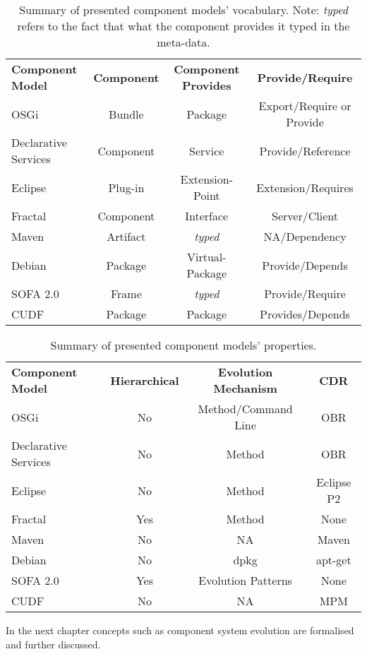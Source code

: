 \begin{table}
\begin{tabular}{|l | c | c | c | }
\textbf{Component Model}& \textbf{Component}& \textbf{Component Provides}	& \textbf{Provide/Require}\\

OSGi					& Bundle			& Package 					& Export/Require or Provide\\
Declarative Services	& Component			& Service 					& Provide/Reference\\
Eclipse					& Plug-in			& Extension-Point			& Extension/Requires\\
Fractal					& Component			& Interface 				& Server/Client\\
Maven					& Artifact			& \textit{typed} 			& NA/Dependency\\
Debian					& Package			& Virtual-Package 			& Provide/Depends\\
SOFA 2.0				& Frame				& \textit{typed} 			& Provide/Require\\
CUDF					& Package			& Package 					& Provides/Depends\\
\end{tabular}
\caption{Summary of presented component models' vocabulary. Note: \textit{typed} refers to the fact that what the component provides it typed in the meta-data.}
\label{background.comparisonvocab}
\end{table}

\begin{table}
\begin{tabular}{l | c | c | c  }
\textbf{Component Model}& \textbf{Hierarchical}& \textbf{Evolution Mechanism}	& \textbf{CDR}\\

OSGi					& No			& Method/Command Line 					& OBR\\
Declarative Services	& No			& Method 								& OBR\\
Eclipse					& No			& Method								& Eclipse P2\\
Fractal					& Yes			& Method 								& None\\
Maven					& No			& NA 									& Maven\\
Debian					& No			& dpkg 									& apt-get\\
SOFA 2.0				& Yes			& Evolution Patterns 					& None\\
CUDF					& No			& NA 									& MPM\\
\end{tabular}
\caption{Summary of presented component models' properties.}
\label{background.comparisonprop}
\end{table}


In the next chapter concepts such as component system evolution are formalised and further discussed.  

